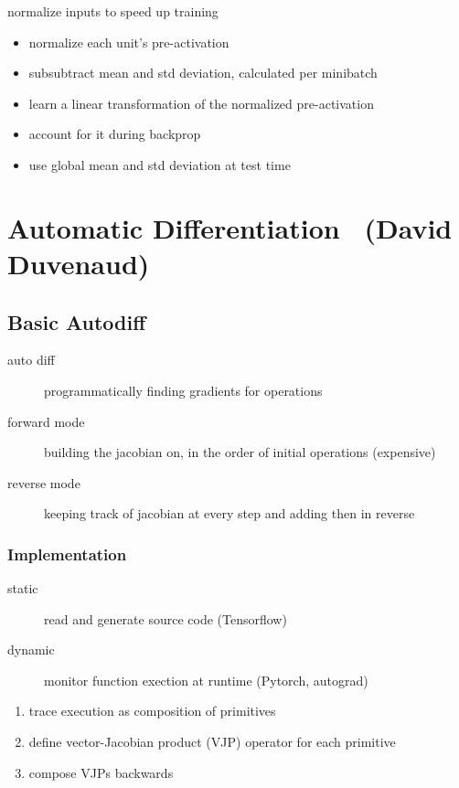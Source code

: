 \documentclass[]{article}
\theoremstyle{definition}
\begin{document}
    normalize inputs to speed up training
    \begin{itemize}
        \item normalize each unit's pre-activation
        \item subsubtract mean and std deviation, calculated per minibatch
        \item learn a linear transformation of the normalized pre-activation
        \item account for it during backprop
        \item use global mean and std deviation at test time
    \end{itemize}


    \section{Automatic Differentiation \ {\small (David Duvenaud)}}%
    \label{sec:automatic_differentiation}

    \subsection{Basic Autodiff}%
    \label{sub:basic_autodiff}

    \begin{description}
        \item[auto diff] programmatically finding gradients for operations
        \item[forward mode] building the jacobian on, in the order of initial operations (expensive)
        \item[reverse mode] keeping track of jacobian at every step and adding then in reverse
    \end{description}

    \subsubsection{Implementation}%
    \label{ssub:implementation}

    \begin{description}
        \item[static] read and generate source code (Tensorflow)
        \item[dynamic] monitor function exection at runtime (Pytorch, autograd)
    \end{description}

    \begin{enumerate}
        \item trace execution as composition of primitives
        \item define vector-Jacobian product (VJP) operator for each primitive
        \item compose VJPs backwards
    \end{enumerate}
\end{document}
